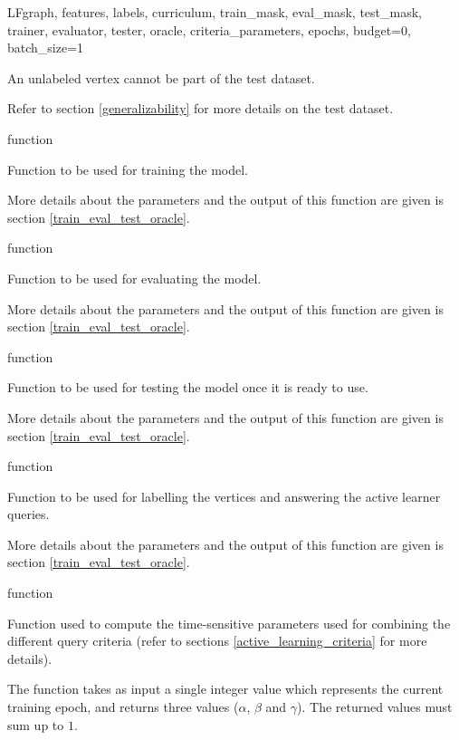 \begin{independentfunctiondoc}{LF}{graph, features, labels, curriculum, train\_mask, eval\_mask, test\_mask, trainer, evaluator, tester, oracle, criteria\_parameters, epochs, budget=0, batch\_size=1}
\begin{functionparameters}
                    An unlabeled vertex cannot be part of the test dataset.
                    
                    Refer to section \ref{generalizability} for more details on the test dataset.
                    \item[trainer] function
                    
                    Function to be used for training the model.
                    
                    More details about the parameters and the output of this function are given is section \ref{train_eval_test_oracle}.
                    \item[evaluator] function
                    
                    Function to be used for evaluating the model.
                    
                    More details about the parameters and the output of this function are given is section \ref{train_eval_test_oracle}.
                    \item[tester] function
                    
                    Function to be used for testing the model once it is ready to use.
                    
                    More details about the parameters and the output of this function are given is section \ref{train_eval_test_oracle}.
                    \item[oracle] function
                    
                    Function to be used for labelling the vertices and answering the active learner queries.
                    
                    More details about the parameters and the output of this function are given is section \ref{train_eval_test_oracle}.
                    \item[criteria\_parameters] function
                    
                    Function used to compute the time-sensitive parameters used for combining the different query criteria (refer to sections \ref{active_learning_criteria} for more details).
                    
                    The function takes as input a single integer value which represents the current training epoch, and returns three values (\(\alpha\), \(\beta\) and \(\gamma\)). The returned values must sum up to \(1\).
                    

\end{functionparameters}
\end{independentfunctiondoc}
